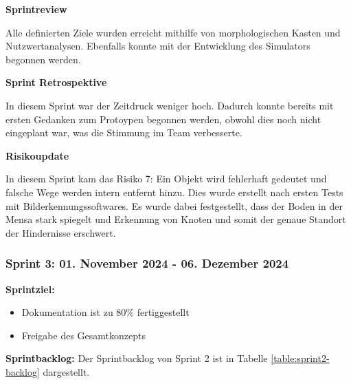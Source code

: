 \textbf{Sprintreview}

Alle definierten Ziele wurden erreicht mithilfe von morphologischen Kasten und Nutzwertanalysen. Ebenfalls konnte mit der Entwicklung des Simulators begonnen werden.

\textbf{Sprint Retrospektive}

In diesem Sprint war der Zeitdruck weniger hoch. Dadurch konnte bereits mit ersten Gedanken zum Protoypen begonnen werden, obwohl dies noch nicht eingeplant war, was die Stimmung im Team verbesserte.

\textbf{Risikoupdate}

In diesem Sprint kam das Risiko 7: Ein Objekt wird fehlerhaft gedeutet und falsche Wege werden intern entfernt hinzu. Dies wurde erstellt nach ersten Tests mit Bilderkennungssoftwares. Es wurde dabei festgestellt, dass der Boden in der Mensa stark spiegelt und Erkennung von Knoten und somit der genaue Standort der Hindernisse erschwert.

\newpage
\subsubsection{Sprint 3: 01. November 2024 - 06. Dezember 2024}

\textbf{Sprintziel:}
\begin{itemize}
    \item Dokumentation ist zu 80\% fertiggestellt
    \item Freigabe des Gesamtkonzepts
\end{itemize}

\textbf{Sprintbacklog:} Der Sprintbacklog von Sprint 2 ist in Tabelle \ref{table:sprint2-backlog} dargestellt.

